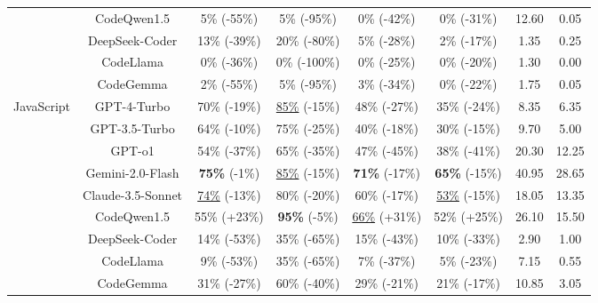 \begin{table}[t]
{\begin{tabular}{cccccccc}
 & CodeQwen1.5 & 5\% (-55\%) & 5\% (-95\%) & 0\% (-42\%) & 0\% (-31\%) & 12.60 & 0.05 \\
 & DeepSeek-Coder & 13\% (-39\%) & 20\% (-80\%) & 5\% (-28\%) & 2\% (-17\%) & 1.35 & 0.25 \\
 & CodeLlama & 0\% (-36\%) & 0\% (-100\%) & 0\% (-25\%) & 0\% (-20\%) & 1.30 & 0.00 \\
 & CodeGemma & 2\% (-55\%) & 5\% (-95\%) & 3\% (-34\%) & 0\% (-22\%) & 1.75 & 0.05 \\
\hline
\multirow{9}{*}{JavaScript} 
 & GPT-4-Turbo & 70\% (-19\%) & \underline{85\%} (-15\%) & 48\% (-27\%) & 35\% (-24\%) & 8.35 & 6.35 \\ 
 & GPT-3.5-Turbo & 64\% (-10\%) & 75\% (-25\%) & 40\% (-18\%) & 30\% (-15\%) & 9.70 & 5.00 \\
 & GPT-o1 & 54\% (-37\%) & 65\% (-35\%) & 47\% (-45\%) & 38\% (-41\%) & 20.30 & 12.25 \\
 & Gemini-2.0-Flash & \textbf{75\%} (-1\%) & \underline{85\%} (-15\%) & \textbf{71\%} (-17\%) & \textbf{65\%} (-15\%) & 40.95 & 28.65 \\
 & Claude-3.5-Sonnet & \underline{74\%} (-13\%) & 80\% (-20\%) & 60\% (-17\%) & \underline{53\%} (-15\%) & 18.05 & 13.35 \\ 
 & CodeQwen1.5 & 55\% (+23\%) & \textbf{95\%} (-5\%) & \underline{66\%} (+31\%) & 52\% (+25\%) & 26.10 & 15.50 \\
 & DeepSeek-Coder & 14\% (-53\%) & 35\% (-65\%) & 15\% (-43\%) & 10\% (-33\%) & 2.90 & 1.00 \\ 
 & CodeLlama & 9\% (-53\%) & 35\% (-65\%) & 7\% (-37\%) & 5\% (-23\%) & 7.15 & 0.55 \\ 
 & CodeGemma & 31\% (-27\%) & 60\% (-40\%) & 29\% (-21\%) & 21\% (-17\%) & 10.85 & 3.05 \\
\hline
\end{tabular}
}
\label{tab: results_self_fix}
\vspace{-10pt}
\end{table}
